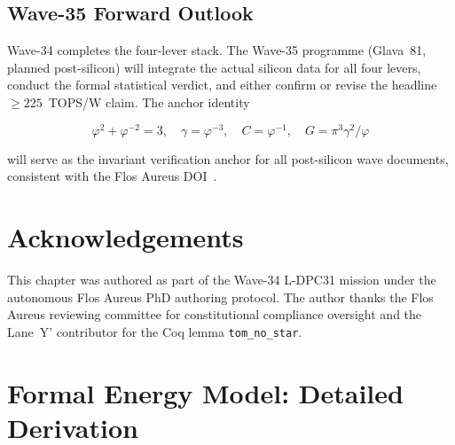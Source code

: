 \subsection{Wave-35 Forward Outlook}

Wave-34 completes the four-lever stack.  The Wave-35 programme (Glava~81,
planned post-silicon) will integrate the actual silicon data for all four
levers, conduct the formal statistical verdict, and either confirm or
revise the headline \(\geq 225\)~TOPS/W claim.  The anchor identity

\[
  \varphi^{2} + \varphi^{-2} = 3,
  \quad
  \gamma = \varphi^{-3},
  \quad
  C = \varphi^{-1},
  \quad
  G = \pi^{3}\gamma^{2}/\varphi
\]

\noindent will serve as the invariant verification anchor for all
post-silicon wave documents, consistent with the Flos Aureus
DOI~\cite{zenodo_flos_aureus}.

\section*{Acknowledgements}

This chapter was authored as part of the Wave-34 L-DPC31 mission under the
autonomous Flos Aureus PhD authoring protocol.  The author thanks
the Flos Aureus reviewing committee for constitutional compliance
oversight and the Lane~Y' contributor for the Coq lemma \texttt{tom\_no\_star}.

%

\appendix

\section{Formal Energy Model: Detailed Derivation}
\label{app:energy_model}

